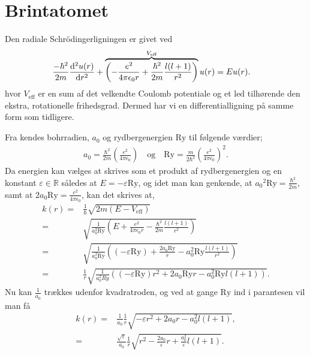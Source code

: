 \section{Brintatomet}
Den radiale Schrödingerligningen er givet ved \cite[s. 140]{griffiths}
%
\begin{align}
    \frac{-\hbar^{2}}{2m}\diff[2]{u(r)}{r} + \overbrace{\left( - \frac{e^{2}}{4\pi\epsilon_{0}r} + \frac{\hbar^{2}}{2m}\frac{l(l+1)}{r^{2}} \right)}^{V_{\text{eff}}} u(r) &  = Eu(r).
\end{align}
%
hvor $V_{\text{eff}}$ er en sum af det velkendte Coulomb potentiale og et led tilhørende den ekstra, rotationelle frihedsgrad. Dermed har vi en differentialligning på samme form som tidligere.

Fra \cite{griffiths} kendes bohrradien, $a_{0}$ og rydbergenergien $\mathrm{Ry}$ til følgende værdier;
\begin{align}
    a_{0} = \frac{\hbar^{2}}{2m} {\left(\frac{e^{2}}{4\pi\epsilon_{0}} \right) \quad \text{og} \quad \mathrm{Ry} = \frac{m}{2\hbar^{2}}\left(\frac{e^{2}}{4\pi\epsilon_0} \right)}^{2}.
    \label{eq:konstanter}
\end{align}
%
Da energien kan vælges at skrives som et produkt af rydbergenergien og en konstant $\varepsilon \in \mathbb{R}$ således at $E=-\varepsilon \mathrm{Ry}$, og idet man kan genkende, at ${a_{0}}^{2}\mathrm{Ry} = \frac{\hbar^{2}}{2m}$, samt at $2a_{0}\mathrm{Ry} = \frac{e^{2}}{4\pi\epsilon_{0}}$, kan det skrives at,
\begin{align}
    k(r) = & \frac{1}{\hbar} \sqrt{2m\left( E - V_{\text{eff}} \right)}\\
    = & \sqrt{\frac{1}{a_{0}^{2}\mathrm{\mathrm{Ry}}} \left( E + \frac{e^{2}}{4\pi\epsilon_{0}r} - \frac{\hbar^{2}}{2m}\frac{l(l+1)}{r^{2}} \right)}\\
    = & \sqrt{\frac{1}{a_{0}^{2}\mathrm{Ry}} \left( (-\varepsilon \mathrm{Ry}) + \frac{2a_{0}\mathrm{Ry}}{r} - a_{0}^{2}\mathrm{Ry}\frac{l(l+1)}{r^{2}} \right)}\\
    = & \frac{1}{r} \sqrt{\frac{1}{a_{0}^{2}{Ry}} \left( (-\varepsilon \mathrm{Ry})r^{2} + 2a_{0}\mathrm{Ry} r - a_{0}^{2}\mathrm{Ry} l(l+1) \right)}.
\end{align}
Nu kan $\frac{1}{a_0}$ trækkes udenfor kvadratroden, og ved at gange $\mathrm{Ry}$ ind i parantesen vil man få
\begin{align}
    k(r) = & \frac{1}{a_0} \frac{1}{r} \sqrt{-\varepsilon r^2 + 2a_0r - a_0^2l(l+1)}, \\
    = & \frac{\sqrt{\varepsilon}}{a_0} \frac{1}{r} \sqrt{r^2 - \frac{2a_0}{\varepsilon}r + \frac{a_0^2}{\varepsilon}l(l+1)}.
\end{align}
